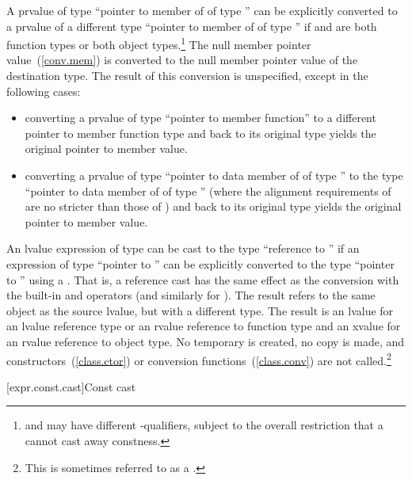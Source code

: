 \pnum
{}%
%
A prvalue of type ``pointer to member of  of type ''
can be explicitly converted to a prvalue of a different type ``pointer to member of
 of type '' if  and  are both
function types or both object types.\footnote{ and  may have
different \cv-qualifiers, subject to
the overall restriction that a  cannot cast away
constness.} The null member pointer value~(\ref{conv.mem}) is converted to the
null member pointer value of the destination type. The result of this
conversion is unspecified, except in the following cases:

\begin{itemize}
\item converting a prvalue of type ``pointer to member function'' to a
different pointer to member function type and back to its original type
yields the original pointer to member value.

\item converting a prvalue of type ``pointer to data member of 
of type '' to the type ``pointer to data member of 
of type '' (where the alignment requirements of  are
no stricter than those of ) and back to its original type
yields the original pointer to member value.
\end{itemize}

\pnum
{}%
%
An lvalue expression of type  can be cast to the type
``reference to '' if an expression of type ``pointer to
'' can be explicitly converted to the type ``pointer to
'' using a . That is, a reference cast
 has the same effect as the conversion
 with the built-in \tcode{\&} and
\tcode{*} operators (and similarly for
). The result refers to the same
object as the source lvalue, but with a different type. The result is an
lvalue for an lvalue reference
type or an rvalue reference to function type
and an xvalue for an rvalue reference
to object type. No
temporary is created, no copy is made, and
constructors~(\ref{class.ctor}) or conversion
functions~(\ref{class.conv}) are not called.\footnote{This
is sometimes referred to as a .}

[expr.const.cast]{Const cast}


